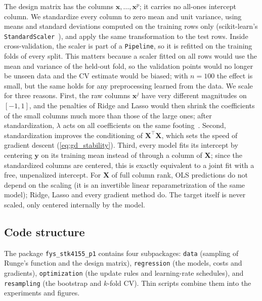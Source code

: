 The design matrix has the columns $\bm{x}, \dots, \bm{x}^p$; it carries no all-ones
intercept column. We standardize every column to zero mean and unit
variance, using means and standard deviations computed on the training rows
only (scikit-learn's \texttt{StandardScaler}~\cite{pedregosa_2011}), and
apply the same transformation to the test rows. Inside cross-validation, the
scaler is part of a \texttt{Pipeline}, so it is refitted on the training folds
of every split. This matters because a scaler fitted on all rows would use the
mean and variance of the held-out fold, so the validation points would no
longer be unseen data and the CV estimate would be biased; with $n=100$ the
effect is small, but the same holds for any preprocessing learned from the
data. We scale for three reasons. First, the raw columns $\bm{x}^j$ have
very different magnitudes on $[-1,1]$, and the penalties of Ridge and Lasso
would then shrink the coefficients of the small columns much more than those of
the large ones; after standardization, $\lambda$ acts on all coefficients on
the same footing~\cite{hjorth-jensen_2026,geron_2023}. Second, standardization improves the
conditioning of $\bm{X}^\top\bm{X}$, which sets the speed of gradient descent
(\cref{eq:gd_stability}). Third, every model fits its intercept by centering
$\bm{y}$ on its training mean instead of through a column of $\bm{X}$; since
the standardized columns are centered, this is exactly equivalent to a joint
fit with a free, unpenalized intercept. For $\bm{X}$ of full column rank, OLS
predictions do not depend on the scaling (it is an invertible linear
reparametrization of the same model); Ridge, Lasso and every gradient method
do. The target itself is
never scaled, only centered internally by the model.

\subsection{Code structure}

The package \texttt{fys\_stk4155\_p1} contains four subpackages: \texttt{data}
(sampling of Runge's function and the design matrix), \texttt{regression} (the
models, costs and gradients), \texttt{optimization} (the update rules and
learning-rate schedules), and \texttt{resampling} (the bootstrap and $k$-fold
CV). Thin scripts combine them into the experiments and figures.

